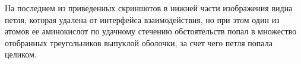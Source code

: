 
На последнем из приведенных скриншотов в нижней части изображения видна петля, которая удалена от интерфейса взаимодействия, но при этом один из атомов ее аминокислот по удачному стечению обстоятельств попал в множество отобранных треугольников выпуклой оболочки, за счет чего петля попала целиком.





